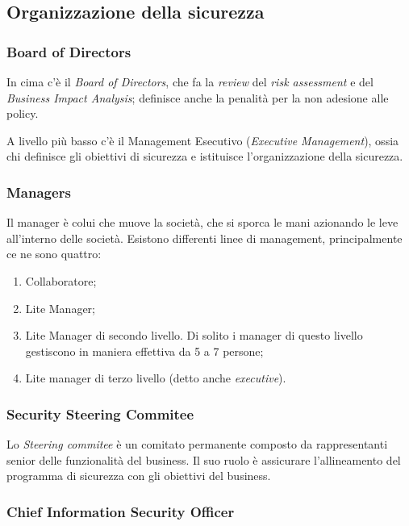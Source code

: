 \subsection{Organizzazione della sicurezza}

\subsubsection{Board of Directors}
In cima c'è il \textit{Board of Directors}, che fa la \textit{review} del
\textit{risk assessment} e del \textit{Business Impact Analysis}; definisce
anche la penalità per la non adesione alle policy.

A livello più basso c'è il Management Esecutivo (\textit{Executive Management}),
ossia chi definisce gli obiettivi di sicurezza e istituisce l'organizzazione
della sicurezza.

\subsubsection{Managers}

Il manager è colui che muove la società, che si sporca le mani azionando le leve
all'interno delle società.
Esistono differenti linee di management, principalmente ce ne sono quattro:
\begin{enumerate}
\item Collaboratore;
\item Lite Manager;
\item Lite Manager di secondo livello. Di solito i manager di questo livello
gestiscono in maniera effettiva da 5 a 7 persone;
\item Lite manager di terzo livello (detto anche \textit{executive}).
\end{enumerate}

\subsubsection{Security Steering Commitee}

Lo \textit{Steering commitee} è un comitato permanente composto da
rappresentanti senior delle funzionalità del business. Il suo ruolo è
assicurare l'allineamento del programma di sicurezza con gli obiettivi del
business.

\subsubsection{Chief Information Security Officer}

